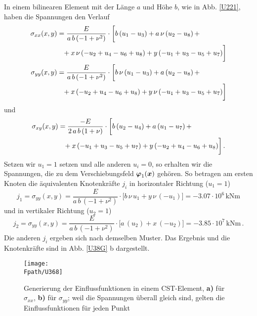 \begin{example}
In einem bilinearen Element mit der L\"{a}nge $a$ und H\"{o}he $b$, wie in Abb. \ref{U221}, haben die Spannungen den Verlauf
\begin{align}\label{SigBilinear1}
\sigma_{xx}(x,y)&=\frac{E}{a\,
     b\,( -1 + \nu^2) }\cdot  \bigg[
     b\,( {u_1} - {u_3}
          )  + a\,\nu\,
        ( {u_2} - {u_8} )\,+\nonumber\\&\hphantom{=}
        + x\, \nu\,(-u_2+u_4 -u_6 +u_8) +y\,(-u_1 + u_3 -u_5+ u_7)\bigg]\\
\sigma_{yy}(x,y)&=\frac{E}{a\,b\,
     ( -1 + \nu^2)}\cdot  \bigg[
      b\,\nu\,
        ( {u_1} - {u_3} )  +
       a\,( {u_2} - {u_8} )\,+\nonumber \\&\hphantom{=}
        +x\,(-u_2 + u_4-u_6+ u_8) +y\,\nu\,(-u_1+u_3-u_5+u_7)  \bigg]
\end{align}
und
\begin{align}
\sigma_{xy}(x,y)&=\frac{- E}{2\,a\,b\,
     ( 1 + \nu )}\cdot  \bigg[
        b\,( {u_2} - {u_4}
             )  + a\,
          ( {u_1} - {u_7} )\,+ \nonumber \\&\hphantom{=}
        +x\,(-u_1 +u_3-u_5+ u_7)+ y\,(-u_2+ u_4-u_6+ u_8) \bigg]\,.
\end{align}
Setzen wir $u_1 = 1$ setzen und alle anderen $u_i = 0$, so erhalten wir die Spannungen, die zu dem Verschiebungsfeld $\mbox{\boldmath $\varphi$}_1(\mbox{\boldmath $x$})$ geh\"{o}ren. So betragen am ersten Knoten die \"{a}quivalenten Knotenkr\"{a}fte $j_i$ in horizontaler Richtung ($u_1 = 1$)
\begin{equation}
j_1 = \sigma_{yy}(x,y) = \frac{E}{a\,b\,
     ( -1 + \nu^2)}\cdot  \bigg[
      b\,\nu\,  {u_1} +y\,\nu\,(-u_1)  \bigg] = -3.07 \cdot 10^6\,\mbox{kNm}
\end{equation}
und in vertikaler Richtung ($u_2 = 1$)
\begin{equation}
j_2 = \sigma_{yy}(x,y) =\frac{E}{a\,b\, ( -1 + \nu^2)}\cdot  \bigg[
             a\,( {u_2} ) +x\,(-u_2) \bigg] = -3.85 \cdot 10^7\,\mbox{kNm}\,.
\end{equation}
Die anderen $j_i$ ergeben sich nach demselben Muster. Das Ergebnis und die Knotenkr\"{a}fte sind in Abb. \ref{U38G} b dargestellt.
\begin{figure}[tbp]
\centering
\if {} \sidecaption \fi
\texttt{[image: \\Fpath/U368]}
\caption{Generierung der Einflussfunktionen in einem CST-Element, \textbf{ a)} f\"{u}r $\sigma_{xx}$, \textbf{ b)} f\"{u}r $\sigma_{yy}$; weil die Spannungen \"{u}berall gleich sind, gelten die Einflussfunktionen f\"{u}r jeden Punkt }
\label{U368}
%
\end{figure}%


\end{example}
